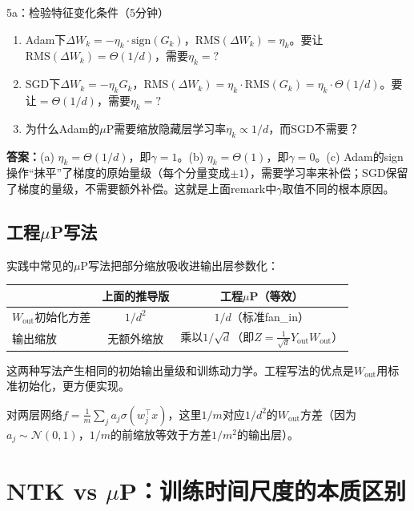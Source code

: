 \documentclass[11pt,a4paper]{article}
\newcommand{\cN}{\mathcal{N}}
\begin{document}
\begin{classexercise}{5a：检验特征变化条件（5分钟）}
\begin{enumerate}[label=(\alph*)]
\item Adam下$\Delta W_k = -\eta_k\cdot\text{sign}(G_k)$，$\text{RMS}(\Delta W_k) = \eta_k$。要让$\text{RMS}(\Delta W_k)=\Theta(1/d)$，需要$\eta_k=?$
\item SGD下$\Delta W_k = -\eta_k G_k$，$\text{RMS}(\Delta W_k)=\eta_k\cdot\text{RMS}(G_k)=\eta_k\cdot\Theta(1/d)$。要让$=\Theta(1/d)$，需要$\eta_k=?$
\item 为什么Adam的$\mu$P需要缩放隐藏层学习率$\eta_k\propto 1/d$，而SGD不需要？
\end{enumerate}

\textbf{答案：}(a) $\eta_k=\Theta(1/d)$，即$\gamma=1$。(b) $\eta_k=\Theta(1)$，即$\gamma=0$。(c) Adam的sign操作``抹平''了梯度的原始量级（每个分量变成$\pm 1$），需要学习率来补偿；SGD保留了梯度的量级，不需要额外补偿。这就是上面remark中$\gamma$取值不同的根本原因。
\end{classexercise}

\subsection{工程$\mu$P写法}

实践中常见的$\mu$P写法把部分缩放吸收进输出层参数化：

\begin{center}
\renewcommand{\arraystretch}{1.3}
\begin{tabular}{l|cc}
\toprule
& 上面的推导版 & 工程$\mu$P（等效） \\
\midrule
$W_{\text{out}}$初始化方差 & $1/d^2$ & $1/d$（标准fan\_in） \\
输出缩放 & 无额外缩放 & 乘以$1/\sqrt{d}$（即$Z=\frac{1}{\sqrt{d}}Y_{\text{out}}W_{\text{out}}$） \\
\bottomrule
\end{tabular}
\end{center}

这两种写法产生相同的初始输出量级和训练动力学。工程写法的优点是$W_{\text{out}}$用标准初始化，更方便实现。

对两层网络$f=\frac{1}{m}\sum_j a_j\sigma(w_j^\top x)$，这里$1/m$对应$1/d^2$的$W_{\text{out}}$方差（因为$a_j\sim\cN(0,1)$，$1/m$的前缩放等效于方差$1/m^2$的输出层）。

\section{NTK vs $\mu$P：训练时间尺度的本质区别}
\end{document}
